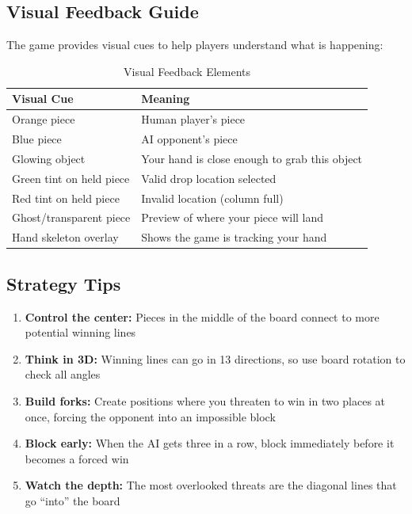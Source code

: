 \documentclass[11pt]{article}
\begin{document}

\subsection{Visual Feedback Guide}

The game provides visual cues to help players understand what is happening:

\begin{table}[H]
\centering
\caption{Visual Feedback Elements}
\begin{tabular}{p{4cm}p{8cm}}
\toprule
\textbf{Visual Cue} & \textbf{Meaning} \\
\midrule
Orange piece & Human player's piece \\
Blue piece & AI opponent's piece \\
Glowing object & Your hand is close enough to grab this object \\
Green tint on held piece & Valid drop location selected \\
Red tint on held piece & Invalid location (column full) \\
Ghost/transparent piece & Preview of where your piece will land \\
Hand skeleton overlay & Shows the game is tracking your hand \\
\bottomrule
\end{tabular}
\end{table}


\subsection{Strategy Tips}

\begin{enumerate}
    \item \textbf{Control the center:} Pieces in the middle of the board connect to more potential winning lines
    \item \textbf{Think in 3D:} Winning lines can go in 13 directions, so use board rotation to check all angles
    \item \textbf{Build forks:} Create positions where you threaten to win in two places at once, forcing the opponent into an impossible block
    \item \textbf{Block early:} When the AI gets three in a row, block immediately before it becomes a forced win
    \item \textbf{Watch the depth:} The most overlooked threats are the diagonal lines that go ``into'' the board
\end{enumerate}
\end{document}
